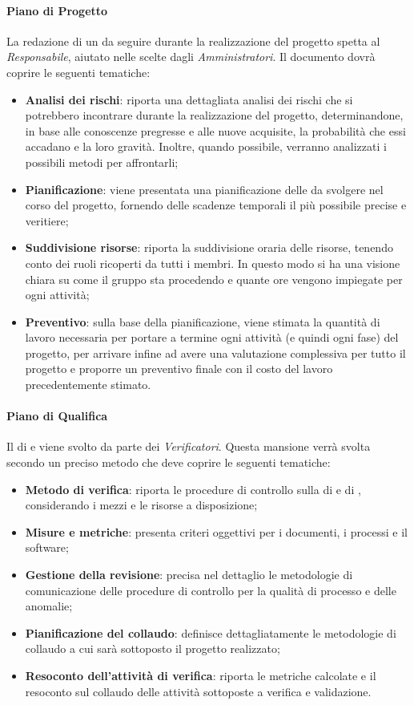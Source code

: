 \paragraph{Piano di Progetto}\Spazio
La redazione di un  da seguire durante la realizzazione del progetto spetta al \emph{Responsabile}, aiutato nelle scelte dagli \emph{Amministratori}. Il documento dovrà coprire le seguenti tematiche:
 \begin{itemize}
 	\item\textbf{{Analisi dei rischi}}: riporta una dettagliata analisi dei rischi che si potrebbero incontrare durante la realizzazione del progetto, determinandone, in base alle conoscenze pregresse e alle nuove acquisite, la probabilità che essi accadano e la loro gravità. Inoltre, quando possibile, verranno analizzati i possibili metodi per affrontarli;
 	\item\textbf{{Pianificazione}}: viene presentata una pianificazione delle  da svolgere nel corso del progetto, fornendo delle scadenze temporali il più possibile precise e veritiere;
 	\item {\textbf{Suddivisione risorse}: riporta la suddivisione oraria delle risorse, tenendo conto dei ruoli ricoperti da tutti i membri. In questo modo si ha una visione chiara su come il gruppo sta procedendo e quante ore vengono impiegate per ogni attività;}
 	\item\textbf{{Preventivo}}: sulla base della pianificazione, viene stimata la quantità di lavoro necessaria per portare a termine ogni attività (e quindi ogni fase) del progetto, per arrivare infine ad avere una valutazione complessiva per tutto il progetto e proporre un preventivo finale con il costo del lavoro precedentemente stimato.
 \end{itemize}
\paragraph{Piano di Qualifica}\Spazio
Il  di  e  viene svolto da parte dei \emph{Verificatori}. Questa mansione verrà svolta secondo un preciso metodo che deve coprire le seguenti tematiche:
\begin{itemize}
	\item\textbf{{Metodo di verifica}}: riporta le procedure di controllo sulla  di  e di , considerando i mezzi e le risorse a disposizione;
	\item\textbf{{Misure e metriche}}: presenta criteri oggettivi per i documenti, i processi e il software;
	\item\textbf{{Gestione della revisione}}: precisa nel dettaglio le metodologie di comunicazione delle procedure di controllo per la qualità di processo e delle anomalie;
	\item\textbf{{Pianificazione del collaudo}}: definisce dettagliatamente le metodologie di collaudo a cui sarà sottoposto il progetto realizzato;
	\item\textbf{{Resoconto dell'attività di verifica}}: riporta le metriche calcolate e il resoconto sul collaudo delle attività sottoposte a verifica e validazione.
\end{itemize}
